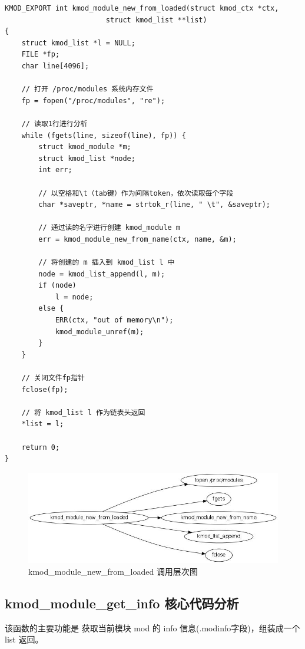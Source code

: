 {\begin{shaded}\begin{verbatim}
KMOD_EXPORT int kmod_module_new_from_loaded(struct kmod_ctx *ctx,
                        struct kmod_list **list)
{
    struct kmod_list *l = NULL;
    FILE *fp;
    char line[4096];

    // 打开 /proc/modules 系统内存文件
    fp = fopen("/proc/modules", "re");

    // 读取1行进行分析
    while (fgets(line, sizeof(line), fp)) {
        struct kmod_module *m;
        struct kmod_list *node;
        int err;

        // 以空格和\t（tab键）作为间隔token，依次读取每个字段
        char *saveptr, *name = strtok_r(line, " \t", &saveptr);

        // 通过读的名字进行创建 kmod_module m
        err = kmod_module_new_from_name(ctx, name, &m);

        // 将创建的 m 插入到 kmod_list l 中
        node = kmod_list_append(l, m);
        if (node)
            l = node;
        else {
            ERR(ctx, "out of memory\n");
            kmod_module_unref(m);
        }
    }

    // 关闭文件fp指针
    fclose(fp);

    // 将 kmod_list l 作为链表头返回
    *list = l;

    return 0;
}
\end{verbatim}\end{shaded}}
\begin{figure}[htbp]
\centering
\includegraphics{./figures/kmod_module_new_from_loaded.jpg}
\caption{kmod\_module\_new\_from\_loaded 调用层次图}
\end{figure}

\subsection{kmod\_module\_get\_info 核心代码分析}

该函数的主要功能是 获取当前模块 mod 的 info
信息(.modinfo字段)，组装成一个 list 返回。

